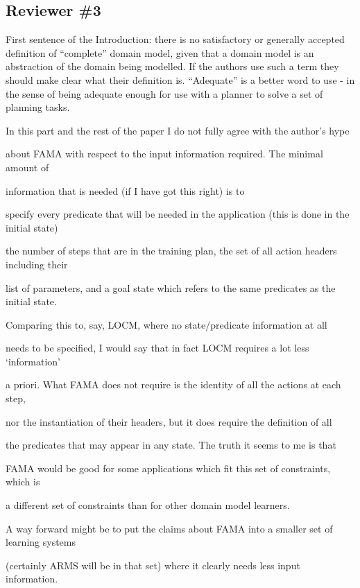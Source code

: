 \documentclass{article}
\begin{document}
\subsection*{Reviewer \#3}


\begin{mdframed}[hidealllines=true,backgroundcolor=gray!20]
First sentence of the Introduction: there is no satisfactory or generally accepted definition of “complete” domain model, given that a domain model is an abstraction of the domain being modelled. If the authors use such a term they should  make clear what their definition is. “Adequate” is a better word to use - in the sense of being adequate enough for use with a planner to solve a set of planning  tasks.
\end{mdframed}

\begin{mdframed}[hidealllines=true,backgroundcolor=gray!20]
  In this part and the rest of the paper I do not fully agree with the author’s hype

about FAMA with respect to the input information required. The minimal amount of

information that is needed (if I have got this right) is to

specify every predicate that will be needed in the application (this is done in the initial state)

the number of steps that are in the training plan, the set of all action headers including their

list of parameters, and a goal state which refers to the same predicates as the initial state.

 Comparing this to, say, LOCM, where no state/predicate information at all

needs to be specified, I would say that in fact LOCM requires a lot less ‘information’

a priori. What FAMA does not require is the identity of all the actions at each step,

nor the instantiation of their headers, but it does require the definition of all

the predicates that may appear in any state. The truth it seems to me is that

FAMA would be good for some applications which fit this set of constraints, which is

a different set of constraints than for other domain model learners.

A way forward might be to put the claims about FAMA into a smaller set of learning systems

(certainly ARMS will be in that set) where it clearly needs less input information.
\end{mdframed}
\end{document}

